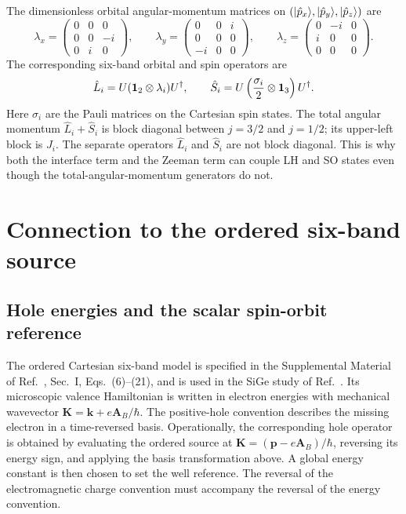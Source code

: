 The dimensionless orbital angular-momentum matrices on $(\lvert  \hat{p}_ x\rangle,\lvert  \hat{p}_ y\rangle,\lvert  \hat{p}_ z\rangle)$ are
\begin{equation}
\lambda_x=\begin{pmatrix}0&0&0\\0&0&-i\\0&i&0\end{pmatrix},\qquad
\lambda_y=\begin{pmatrix}0&0&i\\0&0&0\\-i&0&0\end{pmatrix},\qquad
\lambda_z=\begin{pmatrix}0&-i&0\\i&0&0\\0&0&0\end{pmatrix}.
\label{eq:lambda}
\end{equation}
The corresponding six-band orbital and spin operators are
\begin{equation}
\hat L_i=U(\mathbf 1_2\otimes\lambda_i)U^\dagger,
\qquad
\hat S_i=U\left(\frac{\sigma_i}{2}\otimes\mathbf 1_3\right)U^\dagger.
\label{eq:LS}
\end{equation}
Here $\sigma_i$ are the Pauli matrices on the Cartesian spin states. The total angular momentum $\hat L_i+\hat S_i$ is block diagonal between $j=3/2$ and $j=1/2$; its upper-left block is $J_i$. The separate operators $\hat L_i$ and $\hat S_i$ are not block diagonal. This is why both the interface term and the Zeeman term can couple LH and SO states even though the total-angular-momentum generators do not.

\section{Connection to the ordered six-band source}
\label{app:source}

\subsection{Hole energies and the scalar spin-orbit reference}

The ordered Cartesian six-band model is specified in the Supplemental Material of Ref.~\cite{delvecchio2026}, Sec.~I, Eqs.~(6)--(21), and is used in the SiGe study of Ref.~\cite{valvo}. Its microscopic valence Hamiltonian is written in electron energies with mechanical wavevector $\bm K=\bm k+e\bm A_B/\hbar$. The positive-hole convention describes the missing electron in a time-reversed basis. Operationally, the corresponding hole operator is obtained by evaluating the ordered source at $\bm K=(\bm p-e\bm A_B)/\hbar$, reversing its energy sign, and applying the basis transformation above. A global energy constant is then chosen to set the well reference. The reversal of the electromagnetic charge convention must accompany the reversal of the energy convention.

